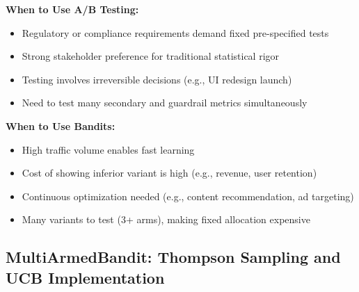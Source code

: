 \textbf{When to Use A/B Testing:}
\begin{itemize}
    \item Regulatory or compliance requirements demand fixed pre-specified tests
    \item Strong stakeholder preference for traditional statistical rigor
    \item Testing involves irreversible decisions (e.g., UI redesign launch)
    \item Need to test many secondary and guardrail metrics simultaneously
\end{itemize}

\textbf{When to Use Bandits:}
\begin{itemize}
    \item High traffic volume enables fast learning
    \item Cost of showing inferior variant is high (e.g., revenue, user retention)
    \item Continuous optimization needed (e.g., content recommendation, ad targeting)
    \item Many variants to test (3+ arms), making fixed allocation expensive
\end{itemize}

\subsection{MultiArmedBandit: Thompson Sampling and UCB Implementation}

